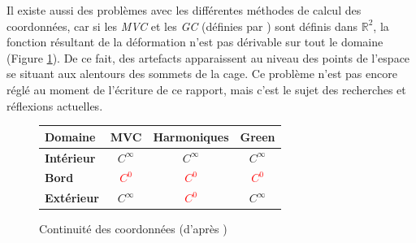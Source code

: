 Il existe aussi des problèmes avec les différentes méthodes de calcul
des coordonnées, car si les \textit{MVC} et les \textit{GC} (définies
par \cite{LLC08}) sont définis dans $\mathbb{R}^2$, la fonction
résultant de la déformation n'est pas dérivable sur tout le domaine
(Figure \ref{SURcoo}). De ce fait, des artefacts apparaissent au
niveau des points de l'espace se situant aux alentours des sommets de
la cage. Ce problème n'est pas encore réglé au moment de l'écriture de
ce rapport, mais c'est le sujet des recherches et réflexions
actuelles.

\begin{figure}[h]
  \begin{center}
    \begin{tabular}{|l|c|c|c|}
      \hline
      \textbf{Domaine} & MVC & Harmoniques & Green\\
      \hline
      \textbf{Intérieur} & \textcolor{OliveGreen}{$C^\infty$} 
      & \textcolor{OliveGreen}{$C^\infty$} 
      & \textcolor{OliveGreen}{$C^\infty$} \\
      \hline
      \textbf{Bord} & \textcolor{Red}{$C^0$} 
      & \textcolor{Red}{$C^0$} 
      & \textcolor{Red}{$C^0$} \\
      \hline
      \textbf{Extérieur} & \textcolor{OliveGreen}{$C^\infty$} 
      & \textcolor{Red}{$C^0$}
      & \textcolor{OliveGreen}{$C^\infty$} \\
      \hline
    \end{tabular}
    \caption{Continuité des coordonnées (d'après \cite{GPCP13})}
    \label{SURcoo}
  \end{center}
\end{figure}



